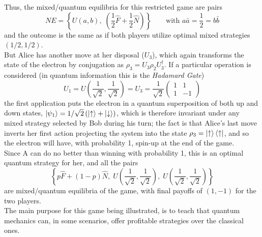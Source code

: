 Thus, the mixed/quantum equilibria for this restricted game are pairs
\[ NE = \left\{ U(a,b), \;\left(\frac{1}{2}\hat{F}+\frac{1}{2}\hat{N}\right) \right\} \qquad \text{with  } a\bar{a}=\frac{1}{2}=b\bar{b}	 \]
and the outcome is the same as if both players utilize optimal mixed strategies $(1/2,1/2)$.\\
But Alice has another move at her disposal ($U_3$), which again transforms the state of the electron by conjugation as $\rho_3=U_3\rho_2U_3^\dagger$. If a particular operation is considered (in quantum information this is the \textit{Hadamard Gate})
\[ U_1 = U\left(\frac{1}{\sqrt{2}},\frac{1}{\sqrt{2}}\right) = U_3 = \frac{1}{\sqrt{2}}\begin{pmatrix} 1&1\\1&-1\end{pmatrix} \]
the first application puts the electron in a quantum superposition of both up and down states, $\ket{\psi_1} = 1/\sqrt{2}\left(\ket{\uparrow}+\ket{\downarrow}\right)$, which is therefore invariant under any mixed strategy selected by Bob during his turn; the fact is that Alice's last move inverts her first action projecting the system into the state $\rho_3=\ket{\uparrow}\bra{\uparrow}$, and so the electron will have, with probability 1, spin-up at the end of the game. \\
Since A can do no better than winning with probability 1, this is an optimal quantum strategy for her, and all the pairs 
\[ \left\{ p\hat{F}+(1-p)\hat{N}, \; U\left(\frac{1}{\sqrt{2}},\frac{1}{\sqrt{2}}\right), \; U\left(\frac{1}{\sqrt{2}},\frac{1}{\sqrt{2}}\right) \right\} \]
are mixed/quantum equilibria of the game, with final payoffs of $(1,-1)$ for the two players.\\
The main purpose for this game being illustrated, is to teach that quantum mechanics can, in some scenarios, offer profitable strategies over the classical ones.




















